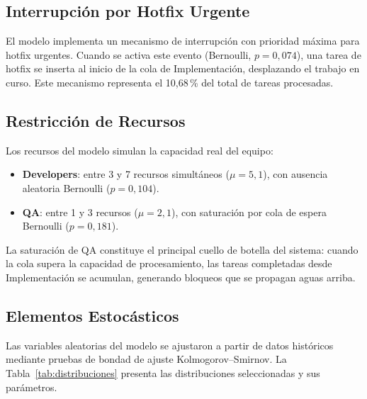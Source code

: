 \documentclass[12pt]{article}
\begin{document}
\subsection{Interrupción por Hotfix Urgente}

El modelo implementa un mecanismo de interrupción con prioridad máxima
para hotfix urgentes. Cuando se activa este evento (Bernoulli,
$p = 0{,}074$), una tarea de hotfix se inserta al inicio de la cola
de Implementación, desplazando el trabajo en curso. Este mecanismo
representa el 10{,}68\,\% del total de tareas procesadas.

\subsection{Restricción de Recursos}

Los recursos del modelo simulan la capacidad real del equipo:
\begin{itemize}
  \item \textbf{Developers}: entre 3 y 7 recursos simultáneos
        ($\mu = 5{,}1$), con ausencia aleatoria Bernoulli
        ($p = 0{,}104$).
  \item \textbf{QA}: entre 1 y 3 recursos ($\mu = 2{,}1$), con
        saturación por cola de espera Bernoulli ($p = 0{,}181$).
\end{itemize}

La saturación de QA constituye el principal cuello de botella del
sistema: cuando la cola supera la capacidad de procesamiento, las
tareas completadas desde Implementación se acumulan, generando
bloqueos que se propagan aguas arriba.

\subsection{Elementos Estocásticos}

Las variables aleatorias del modelo se ajustaron a partir de datos
históricos mediante pruebas de bondad de ajuste Kolmogorov--Smirnov.
La Tabla~\ref{tab:distribuciones} presenta las distribuciones
seleccionadas y sus parámetros.
\end{document}
